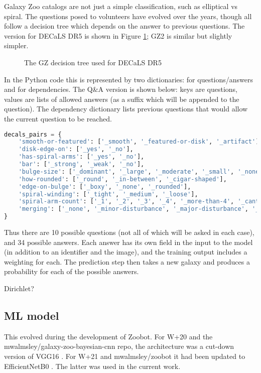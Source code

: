 \documentclass[preprint]{aastex63}
\newcommand{\todo}{\color{red}{TODO}\color{black}\hspace{2mm}}
\begin{document}
Galaxy Zoo catalogs are not just a simple classification, such as elliptical vs spiral. The questions posed to volunteers have evolved over the years, though all follow a decision tree which depends on the answer to previous questions. The version for DECaLS DR5 is shown in Figure \ref{fig:decals_decisions}; GZ2 is similar but slightly simpler.

\begin{figure}[htb!]
	\caption{The GZ decision tree used for DECaLS DR5
		\label{fig:decals_decisions}}
\end{figure}

In the Python code this is represented by two dictionaries: for questions/answers and for dependencies. The Q\&A version is shown below: keys are questions, values are lists of allowed answers (as a suffix which will be appended to the question). The dependency dictionary lists previous questions that would allow the current question to be reached.

\begin{lstlisting}[language=Python]
decals_pairs = {
	'smooth-or-featured': ['_smooth', '_featured-or-disk', '_artifact'],
	'disk-edge-on': ['_yes', '_no'],
	'has-spiral-arms': ['_yes', '_no'],
	'bar': ['_strong', '_weak', '_no'],
	'bulge-size': ['_dominant', '_large', '_moderate', '_small', '_none'],
	'how-rounded': ['_round', '_in-between', '_cigar-shaped'],
	'edge-on-bulge': ['_boxy', '_none', '_rounded'],
	'spiral-winding': ['_tight', '_medium', '_loose'],
	'spiral-arm-count': ['_1', '_2', '_3', '_4', '_more-than-4', '_cant-tell'],
	'merging': ['_none', '_minor-disturbance', '_major-disturbance', '_merger']
}
\end{lstlisting}

Thus there are 10 possible questions (not all of which will be asked in each case), and 34 possible answers. Each answer has its own field in the input to the model (in addition to an identifier and the image), and the training output includes a weighting for each. The prediction step then takes a new galaxy and produces a probability for each of the possible answers.

\todo Dirichlet?

\subsection{ML model} \label{model}

This evolved during the development of Zoobot. For W+20 and the mwalmsley/galaxy-zoo-bayesian-cnn repo, the architecture was a cut-down version of VGG16 \citep{2014arXiv1409.1556S}. For W+21 and mwalmsley/zoobot it had been updated to EfficientNetB0 \citep{2019arXiv190511946T}. The latter was used in the current work.
\end{document}
